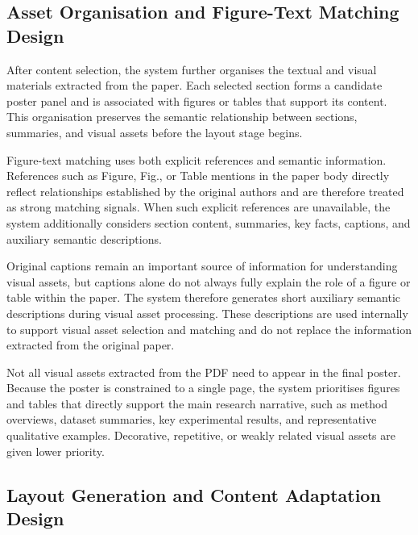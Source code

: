 \documentclass[12pt,oneside]{report}
\begin{document}
\subsection{Asset Organisation and Figure-Text Matching Design}

After content selection, the system further organises the textual and visual materials extracted from the paper. Each selected section forms a candidate poster panel and is associated with figures or tables that support its content. This organisation preserves the semantic relationship between sections, summaries, and visual assets before the layout stage begins.

\vspace{1em}

Figure-text matching uses both explicit references and semantic information. References such as Figure, Fig., or Table mentions in the paper body directly reflect relationships established by the original authors and are therefore treated as strong matching signals. When such explicit references are unavailable, the system additionally considers section content, summaries, key facts, captions, and auxiliary semantic descriptions.

\vspace{1em}

Original captions remain an important source of information for understanding visual assets, but captions alone do not always fully explain the role of a figure or table within the paper. The system therefore generates short auxiliary semantic descriptions during visual asset processing. These descriptions are used internally to support visual asset selection and matching and do not replace the information extracted from the original paper.

\vspace{1em}

Not all visual assets extracted from the PDF need to appear in the final poster. Because the poster is constrained to a single page, the system prioritises figures and tables that directly support the main research narrative, such as method overviews, dataset summaries, key experimental results, and representative qualitative examples. Decorative, repetitive, or weakly related visual assets are given lower priority.

\subsection{Layout Generation and Content Adaptation Design}
\end{document}
